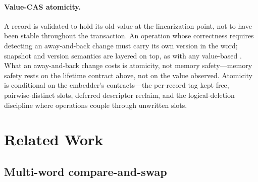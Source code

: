 \documentclass[11pt]{article}
\begin{document}
\paragraph{Value-CAS atomicity.} A record is validated to hold its old value at
the linearization point, not to have been stable throughout the transaction. An
operation whose correctness requires detecting an away-and-back change must carry
its own version in the word; snapshot and version semantics are layered on top,
as with any value-based \mcas. What an away-and-back change costs is atomicity,
not memory safety---memory safety rests on the lifetime contract above, not on
the value observed. Atomicity is conditional on the embedder's contracts---the
per-record tag kept free,
pairwise-distinct slots, deferred descriptor reclaim, and the logical-deletion
discipline where
operations couple through unwritten slots.

\section{Related Work}
\label{sec:related}

\subsection{Multi-word compare-and-swap}
\end{document}

